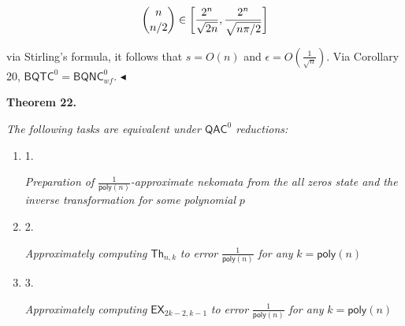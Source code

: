 \[\begin{gathered}
\displaystyle\dbinom{n}{n/2}\in\bigg{[}\frac{2^{n}}{\sqrt{2n}},\frac{2^{n}}{\sqrt{n\pi/2}}\bigg{]}
\end{gathered}\]


via Stirling’s formula, it follows that $s=O(n)$ and $\epsilon=O(\frac{1}{\sqrt{n}})$. Via Corollary 20, ${\mathsf{BQTC}}^{0}={\mathsf{BQNC}}^{0}_{wf}$.
$\blacktriangleleft$\par





\par\medskip\noindent\textbf{
\textbf{Theorem 22}\textbf{.}
}\par



\emph{The following tasks are equivalent under ${\mathsf{QAC}}^{0}$ reductions:}\par


\begin{enumerate}


\item[] 
1. 


\emph{Preparation of }$\frac{1}{{\mathsf{poly}}(n)}$\emph{-approximate nekomata from the all zeros state and the inverse transformation for some polynomial }$p$\emph{}\par





\item[] 
2. 


\emph{Approximately computing }$\mathsf{Th}_{n,k}$\emph{ to error }$\frac{1}{{\mathsf{poly}}(n)}$\emph{ for any }$k={\mathsf{poly}}(n)$\emph{}\par





\item[] 
3. 


\emph{Approximately computing }$\mathsf{EX}_{2k-2,k-1}$\emph{ to error }$\frac{1}{{\mathsf{poly}}(n)}$\emph{ for any }$k={\mathsf{poly}}(n)$\emph{}\par





\end{enumerate}







